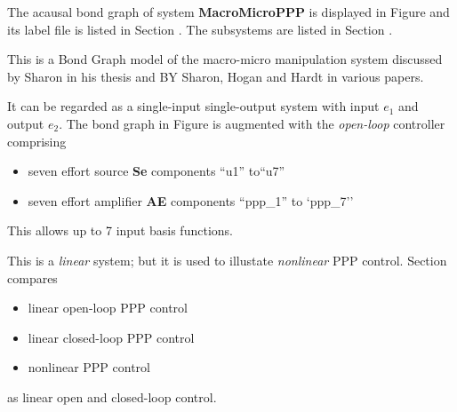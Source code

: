 

   The acausal bond graph of system \textbf{MacroMicroPPP} is
   displayed in Figure  and its label
   file is listed in Section .
   The subsystems are listed in Section .

This is a Bond Graph model of the macro-micro manipulation system
discussed by Sharon in his thesis and BY Sharon, Hogan and Hardt in
various papers.

It can be regarded as a single-input single-output system with input
$e_1$ and output $e_2$.  The bond graph in Figure  is
augmented with the {\em open-loop\/} controller comprising
\begin{itemize}
\item seven effort source \textbf{Se} components ``u1'' to``u7''
\item seven effort amplifier \textbf{AE} components ``ppp\_1'' to `ppp\_7''
\end{itemize}
This allows up to 7 input basis functions.

This is a \emph{linear} system; but it is used to illustate
\emph{nonlinear} PPP control. 
Section  compares
\begin{itemize}
\item linear open-loop PPP control
\item linear closed-loop PPP control
\item nonlinear PPP control
\end{itemize}
as linear open and closed-loop control.

